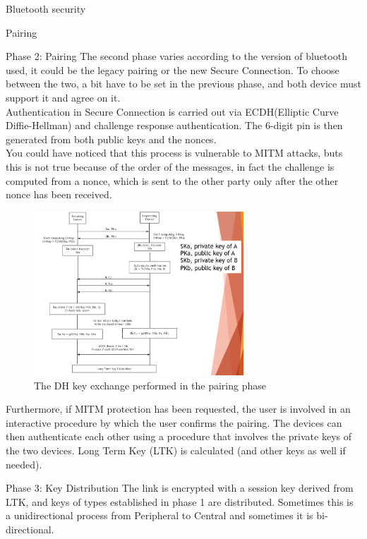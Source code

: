 \begin{section}{Bluetooth security}
\begin{subsection}{Pairing}
    \begin{subsubsection}{Phase 2: Pairing}
      The second phase varies according to the version of bluetooth used, it could be the legacy
      pairing or the new Secure Connection. To choose between the two, a bit have to be set in the
      previous phase, and both device must support it and agree on it.\\
      Authentication in Secure Connection is carried out via ECDH(Elliptic Curve Diffie-Hellman) and
      challenge response authentication. The 6-digit pin is then generated from both public keys and
      the nonces.\\
      You could have noticed that this process is vulnerable to MITM attacks, buts this is not true
      because of the order of the messages, in fact the challenge is computed from a nonce, which is
      sent to the other party only after the other nonce has been received.\\
      \begin{figure}[H]
        \centering
        \includegraphics[width=0.7\textwidth]{img/wireless/bt pairing dhke.png}
        \caption{The DH key exchange performed in the pairing phase}
      \end{figure}
      Furthermore, if MITM protection has been requested, the user is involved in an interactive
      procedure by which the user confirms the pairing. The devices can then authenticate each other
      using a procedure that involves the private keys of the two devices. Long Term Key (LTK) is
      calculated (and other keys as well if needed).\\

    \end{subsubsection}

    \begin{subsubsection}{Phase 3: Key Distribution}
      The link is encrypted with a session key derived from LTK, and keys of types established in
      phase 1 are distributed. Sometimes this is a unidirectional process from Peripheral to Central
      and sometimes it is bi-directional.
    \end{subsubsection}
  \end{subsection}
\end{section}

